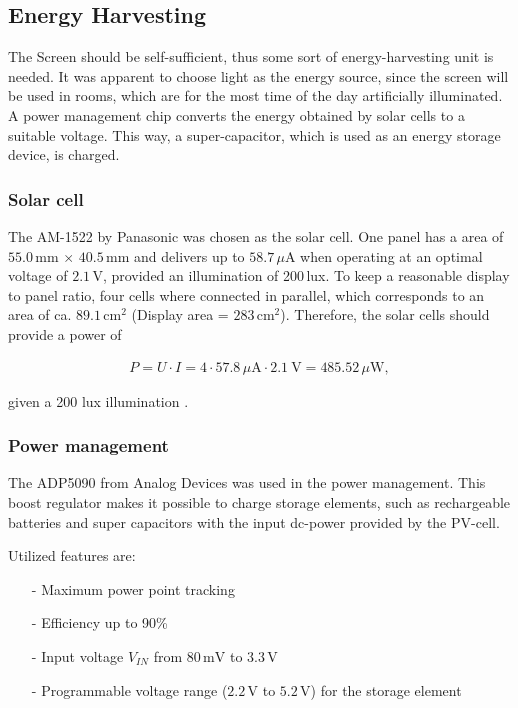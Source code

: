 \subsection{Energy Harvesting}
The Screen should be self-sufficient, thus some sort of energy-harvesting unit is needed.
It was apparent to choose light as the energy source, since the screen will be used in rooms, which are for the most time of the day artificially illuminated.
A power management chip converts the energy  obtained by solar cells to a suitable voltage.
This way, a super-capacitor, which is used as an energy storage device, is charged.

\subsubsection{Solar cell}
The AM-1522 by Panasonic was chosen as the solar cell.
One panel has a area of $55.0\,\text{mm}\,\times\,40.5\,\text{mm}$ and delivers up to $58.7\, \mu\text{A}$ when operating at an optimal voltage of $2.1\,\text{V}$, provided an illumination of 200\,lux.
To keep a reasonable display to panel ratio, four cells where connected in parallel, which corresponds to an area of ca. $89.1\,\text{cm}^2$ (Display area = $283\,\text{cm}^2$). Therefore, the solar cells should provide a power of

\begin{align}
	P = U\cdot I = 4\cdot 57.8\,\mu\text{A}\cdot 2.1\ \text{V}=485.52\,\mu \text{W},\label{development:cell_power}
\end{align}

given a 200 lux illumination \cite{amorton}.

\subsubsection{Power management}
The ADP5090 from Analog Devices was used in the power management.
This boost regulator makes it possible to charge storage elements, such as rechargeable batteries and super capacitors with the input dc-power provided by the PV-cell.

Utilized features are:
\begin{itemize}
	\item[-] Maximum power point tracking
	\item[-] Efficiency up to 90\%
	\item[-] Input voltage $V_{IN}$ from $80\,\text{mV}$ to $3.3\,\text{V}$
	\item[-] Programmable voltage range ($2.2\,\text{V}$ to $5.2\,\text{V}$) for the storage element
\end{itemize}

